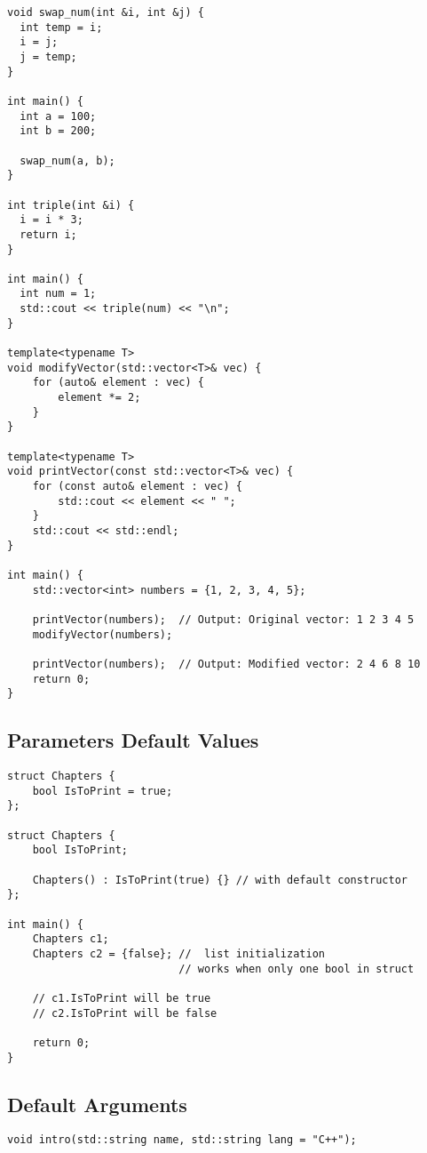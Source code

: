 \documentclass[openany]{report}
\begin{document}
\begin{verbatim}
void swap_num(int &i, int &j) {
  int temp = i;
  i = j;
  j = temp;
}
 
int main() {
  int a = 100;
  int b = 200;
 
  swap_num(a, b);
}

int triple(int &i) {
  i = i * 3;
  return i;
}

int main() {
  int num = 1;
  std::cout << triple(num) << "\n";
}

template<typename T>
void modifyVector(std::vector<T>& vec) {
    for (auto& element : vec) {
        element *= 2;
    }
}

template<typename T>
void printVector(const std::vector<T>& vec) {
    for (const auto& element : vec) {
        std::cout << element << " ";
    }
    std::cout << std::endl;
}

int main() {
    std::vector<int> numbers = {1, 2, 3, 4, 5};

    printVector(numbers);  // Output: Original vector: 1 2 3 4 5
    modifyVector(numbers);

    printVector(numbers);  // Output: Modified vector: 2 4 6 8 10
    return 0;
}
\end{verbatim}

\subsection{Parameters Default Values}

\begin{verbatim}
struct Chapters {
    bool IsToPrint = true;
};

struct Chapters {
    bool IsToPrint;

    Chapters() : IsToPrint(true) {} // with default constructor
};

int main() {
    Chapters c1;
    Chapters c2 = {false}; //  list initialization
                           // works when only one bool in struct

    // c1.IsToPrint will be true
    // c2.IsToPrint will be false

    return 0;
}
\end{verbatim}

\subsection{Default Arguments}

\begin{verbatim}
void intro(std::string name, std::string lang = "C++");
\end{verbatim}
\end{document}
